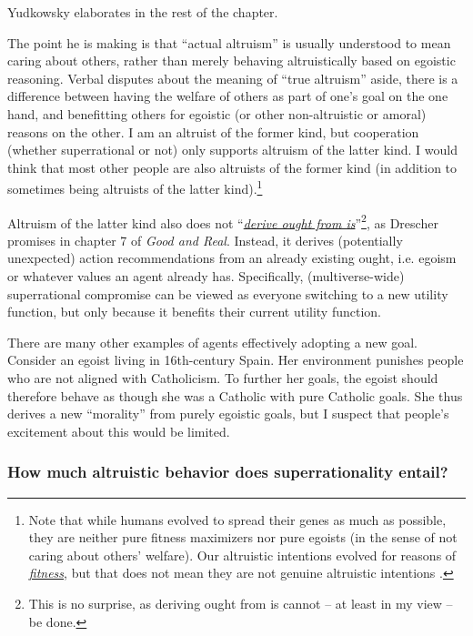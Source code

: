 Yudkowsky elaborates in the rest of the chapter.

The point he is making is that ``actual altruism'' is usually understood
to mean caring about others, rather than merely behaving altruistically
based on egoistic reasoning. Verbal disputes about the meaning of ``true
altruism'' aside, there is a difference between having the welfare of
others as part of one's goal on the one hand, and benefitting others for
egoistic (or other non-altruistic or amoral) reasons on the other. I am
an altruist of the former kind, but cooperation (whether superrational
or not) only supports altruism of the latter kind. I would think that
most other people are also altruists of the former kind (in addition to
sometimes being altruists of the latter kind).\footnote{Note that while
  humans evolved to spread their genes as much as possible, they are
  neither pure fitness maximizers nor pure egoists (in the sense of not
  caring about others' welfare). Our altruistic intentions evolved for
  reasons of
  \href{https://en.wikipedia.org/wiki/Fitness_\%28biology\%29}{\emph{fitness}},
  but that does not mean they are not genuine altruistic intentions
  \parencite{Yudkowsky2015-tz,Cosmides1995-bz,Wright1995-po}.}

Altruism of the latter kind also does not
``\href{https://en.wikipedia.org/wiki/Is\%E2\%80\%93ought_problem}{\emph{derive
ought from is}}''\footnote{This is no surprise, as
  deriving ought from is cannot -- at least in my view -- be done.}, as
Drescher promises in chapter 7 of \emph{Good and Real}. Instead, it
derives (potentially unexpected) action recommendations from an already
existing ought, i.e. egoism or whatever values an agent already has.
Specifically, (multiverse-wide) superrational compromise can be viewed
as everyone switching to a new utility function, but only because it
benefits their current utility function.

There are many other examples of agents effectively adopting a new goal.
Consider an egoist living in 16th-century Spain. Her environment
punishes people who are not aligned with Catholicism. To further her
goals, the egoist should therefore behave as though she was a Catholic
with pure Catholic goals. She thus derives a new ``morality'' from
purely egoistic goals, but I suspect that people's excitement about this
would be limited.

\subsubsection{How much altruistic behavior does superrationality
entail?}\label{how-much-altruistic-behavior-does-superrationality-entail}

